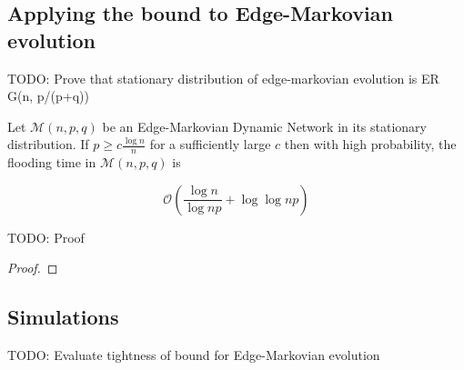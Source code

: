 \subsection{Applying the bound to Edge-Markovian evolution}

TODO: Prove that stationary distribution of edge-markovian evolution is ER G(n, p/(p+q))

\begin{theorem}
	Let $\mathcal{M}(n, p, q)$ be an Edge-Markovian Dynamic Network in its stationary distribution. If $p \geq c \frac{\log n}{n}$ for a sufficiently large $c$ then with high probability, the flooding time in $\mathcal{M}(n, p, q)$ is 

	$$
		\mathcal{O}\left(\frac{\log n}{\log np} + \log \log np \right)
	$$
\end{theorem}

TODO: Proof

\begin{proof}
	
\end{proof}


\subsection{Simulations}

TODO: Evaluate tightness of bound for Edge-Markovian evolution